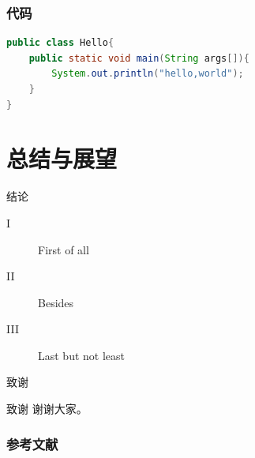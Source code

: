 \documentclass[hyperref,UTF8,11pt]{beamer}
\begin{document}
\begin{frame}[fragile]
    \frametitle{代码}
    \begin{lstlisting}[language=java]
public class Hello{
    public static void main(String args[]){
        System.out.println("hello,world");
    }
}\end{lstlisting}
\end{frame}

\section{总结与展望}

\begin{frame}{结论}
    \begin{description}
        \item[I] First of all
        \item[II] Besides
        \item[III] Last but not least
    \end{description}
\end{frame}

\begin{frame}{致谢}
    \begin{block}{致谢}
        谢谢大家。
    \end{block}
\end{frame}

\begin{frame}[allowframebreaks]
    \frametitle{参考文献}
    
    
\end{frame}
\end{document}
